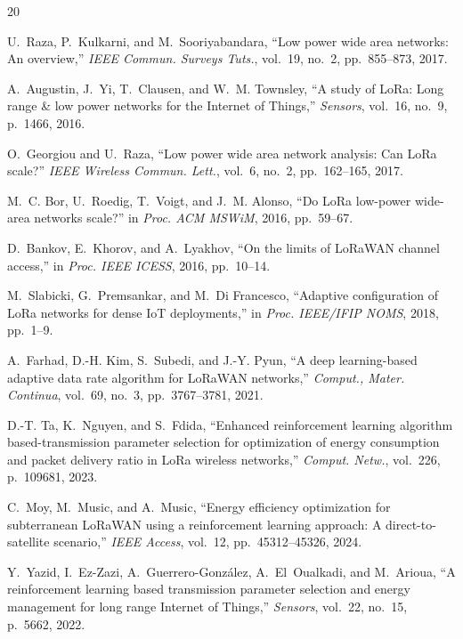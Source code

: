 \documentclass[conference]{IEEEtran}
\begin{document}

\balance
\begin{thebibliography}{20}

U.~Raza, P.~Kulkarni, and M.~Sooriyabandara, ``Low power wide area networks: An overview,'' \textit{IEEE Commun. Surveys Tuts.}, vol.~19, no.~2, pp.~855--873, 2017.

A.~Augustin, J.~Yi, T.~Clausen, and W.~M. Townsley, ``A study of LoRa: Long range \& low power networks for the Internet of Things,'' \textit{Sensors}, vol.~16, no.~9, p.~1466, 2016.

O.~Georgiou and U.~Raza, ``Low power wide area network analysis: Can LoRa scale?'' \textit{IEEE Wireless Commun. Lett.}, vol.~6, no.~2, pp.~162--165, 2017.

M.~C. Bor, U.~Roedig, T.~Voigt, and J.~M. Alonso, ``Do LoRa low-power wide-area networks scale?'' in \textit{Proc. ACM MSWiM}, 2016, pp.~59--67.

D.~Bankov, E.~Khorov, and A.~Lyakhov, ``On the limits of LoRaWAN channel access,'' in \textit{Proc. IEEE ICESS}, 2016, pp.~10--14.

M.~Slabicki, G.~Premsankar, and M.~Di Francesco, ``Adaptive configuration of LoRa networks for dense IoT deployments,'' in \textit{Proc. IEEE/IFIP NOMS}, 2018, pp.~1--9.

A.~Farhad, D.-H. Kim, S.~Subedi, and J.-Y. Pyun, ``A deep learning-based adaptive data rate algorithm for LoRaWAN networks,'' \textit{Comput., Mater. Continua}, vol.~69, no.~3, pp.~3767--3781, 2021.

D.-T. Ta, K.~Nguyen, and S.~Fdida, ``Enhanced reinforcement learning algorithm based-transmission parameter selection for optimization of energy consumption and packet delivery ratio in LoRa wireless networks,'' \textit{Comput. Netw.}, vol.~226, p.~109681, 2023.

C.~Moy, M.~Music, and A.~Music, ``Energy efficiency optimization for subterranean LoRaWAN using a reinforcement learning approach: A direct-to-satellite scenario,'' \textit{IEEE Access}, vol.~12, pp.~45312--45326, 2024.

Y.~Yazid, I.~Ez-Zazi, A.~Guerrero-Gonz\'alez, A.~El~Oualkadi, and M.~Arioua, ``A reinforcement learning based transmission parameter selection and energy management for long range Internet of Things,'' \textit{Sensors}, vol.~22, no.~15, p.~5662, 2022.


\end{thebibliography}
\end{document}

